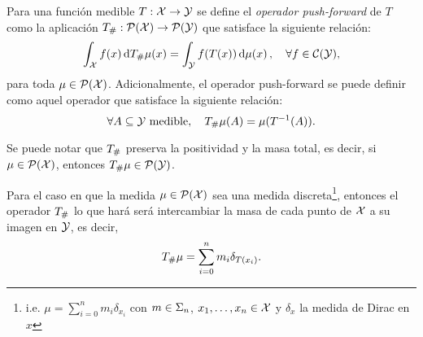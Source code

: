 {  \begin{definition}
	  Para una función medible $T:\cX \to \cY$ se define el \emph{operador push-forward} de $T$ como la aplicación $\Tpf:\ProbSpace[\cX] \to \ProbSpace[\cY]$ que satisface la siguiente relación:
	  \begin{equation}
		  \label{eq:pushForward}
		  \int_{\cX} f(x) \dd{\Tpf\mu(x)} = \int_{\cY} f(T(x)) \dmu[x], \quad \forall f \in \mathcal{C}(\cY),
	  \end{equation}
	  para toda $\mu \in \ProbSpace[\cX]$. Adicionalmente, el operador push-forward se puede definir como aquel operador que satisface la siguiente relación:
	  \begin{equation}
		  \label{eq:pushForward2}
		  \forall A \subseteq \cY \text{ medible}, \quad \Tpf\mu(A) = \mu(T^{-1}(A)).
	  \end{equation}
  \end{definition}

  \begin{remark}
	  Se puede notar que $\Tpf$ preserva la positividad y la masa total, es decir, si $\mu \in \ProbSpace[\cX]$, entonces $\Tpf\mu \in \ProbSpace[\cY]$.
  \end{remark}

  \begin{remark}
	  Para el caso en que la medida $\mu \in \ProbSpace$ sea una medida discreta\footnote{i.e. $\mu = \sum_{i=0}^{n} m_i \delta_{x_i}$ con $m\in\Simplex$, $x_1,\ldots, x_n\in\cX$ y $\delta_x$ la medida de Dirac en $x$}, entonces el operador $\Tpf$ lo que hará será intercambiar la masa de cada punto de $\cX$ a su imagen en $\cY$, es decir,
	  \begin{equation}
		  \label{eq:pushForwardDiscreto}
		  \Tpf\mu = \sum_{i=0}^{n} m_i \delta_{T(x_i)}.
	  \end{equation}

  \end{remark}



 }

